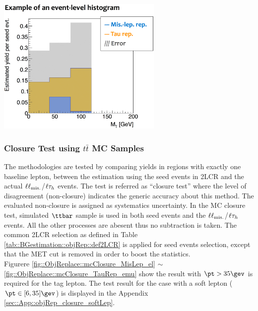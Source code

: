 \begin{center}
\includegraphics[width=80mm]{figures/BGestimation/ObjReplacement/method/evtLevel_histogram.eps}
\label{fig::BGestimation::objRep::evtLevelHist}
\end{center}


\clearpage
\subsubsection{Closure Test using $t\bar{t}$ MC Samples} \label{sec::BGestimation::objRep::mcClosure} 
The methodologies are tested by comparing yields in regions with exactly one baseline lepton, between the estimation using the seed events in 2LCR and the actual $\ell\ell_{\mathrm{mis.}}$/$\ell\tau_h$ events. 
The test is referred as ``closure test'' where the level of disagreement (non-closure) indicates the generic accuracy about this method. The evaluated non-closure is assigned as systematics uncertainty. 
In the MC closure test, simulated $\ttbar$ sample is used in both seed events and the $\ell\ell_{\mathrm{mis.}}$/$\ell\tau_h$ events. All the other processes are abesent thus no subtraction is taken.
The common 2LCR selection as defined in Table \ref{tab::BGestimation::objRep::def2LCR} is applied for seed events selection, except that the MET cut is removed in order to boost the statistics. \\

Figurere \ref{fig::ObjReplace::mcClosure_MisLep_el} $\sim$ \ref{fig::ObjReplace::mcClosure_TauRep_emu} show the result with $\pt>35\gev$ is required for the tag lepton. The test result for the case with a soft lepton ($\pt\in[6,35]\gev$) is displayed in the Appendix \ref{sec::App::objRep_closure_softLep}. 

